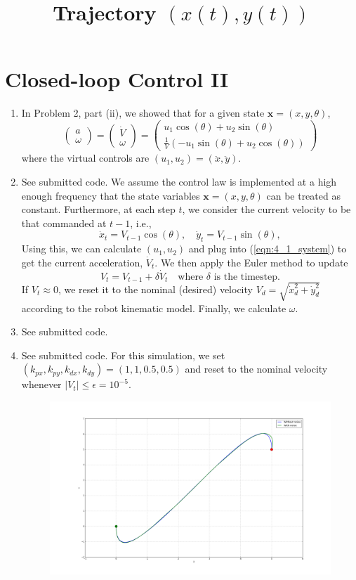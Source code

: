 \documentclass[12pt]{article}
\begin{document}
\section{Closed-loop Control II}
\begin{enumerate}
	\item In Problem 2, part (ii), we showed that for a given state $\mathbf{x} = (x,y,\theta)$,
	\begin{equation}\label{eqn:4_1_system}
		\left(\begin{array}{c}
		a \\
		\omega
		\end{array}\right) =
		\left(\begin{array}{c}
		\dot V \\
		\omega
		\end{array}\right) =
		\left(\begin{array}{c}
		u_1\cos(\theta) + u_2\sin(\theta) \\
		\frac{1}{V}(-u_1\sin(\theta) + u_2\cos(\theta))
		\end{array}\right)
	\end{equation}
	where the virtual controls are $(u_1,u_2) = (\ddot x, \ddot y)$.
	\item See submitted code. We assume the control law is implemented at a high enough frequency that the state variables $\mathbf{x} = (x,y,\theta)$ can be treated as constant. Furthermore, at each step $t$, we consider the current velocity to be that commanded at $t-1$, i.e.,
	\[
		\dot x_t = V_{t-1}\cos(\theta), \quad \dot y_t = V_{t-1}\sin(\theta),
	\]
	Using this, we can calculate $(u_1,u_2)$ and plug into (\ref{eqn:4_1_system}) to get the current acceleration, $\dot V_t$. We then apply the Euler method to update
	\[
		V_t = V_{t-1} + \delta\dot V_t \quad \mbox{where $\delta$ is the timestep}.
	\]
	If $V_t \approx 0$, we reset it to the nominal (desired) velocity $V_d = \sqrt{\dot x_d^2 + \dot y_d^2}$ according to the robot kinematic model. Finally, we calculate $\omega$.
	\item See submitted code.
	\item See submitted code. For this simulation, we set $(k_{px}, k_{py}, k_{dx}, k_{dy}) = (1,1,0.5,0.5)$ and reset to the nominal velocity whenever $|V_t| \leq \epsilon = 10^{-5}$.
	\begin{figure}[H]
		\centering
		\title{\bf Trajectory $(x(t), y(t))$}
		\includegraphics[width=\textwidth]{../Figures/hw1_4_iv_traj.png}

\end{figure}
\end{enumerate}
\end{document}
